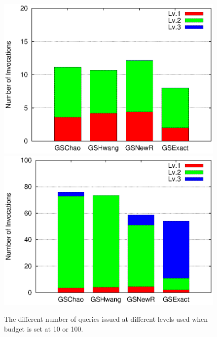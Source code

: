 \begin{figure}[h]
	\vspace{-10pt}
    \includegraphics[clip,scale=0.32]{figs/levelBudget10.eps}
	\hspace{-10pt}
	\includegraphics[clip,scale=0.32]{figs/levelBudget100.eps}
	\vspace{-10pt}
	\caption{The different number of queries issued at different levels used when budget is set at 10 or 100.}\label{fig:level}
	\vspace{-10pt}
\end{figure}

